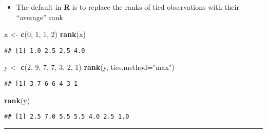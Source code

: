 \documentclass[]{book}
\newenvironment{Shaded}{\begin{snugshade}}{\end{snugshade}}
\newcommand{\DataTypeTok}[1]{\textcolor[rgb]{0.13,0.29,0.53}{#1}}
\newcommand{\DecValTok}[1]{\textcolor[rgb]{0.00,0.00,0.81}{#1}}
\newcommand{\KeywordTok}[1]{\textcolor[rgb]{0.13,0.29,0.53}{\textbf{#1}}}
\newcommand{\NormalTok}[1]{#1}
\newcommand{\StringTok}[1]{\textcolor[rgb]{0.31,0.60,0.02}{#1}}
\providecommand{\tightlist}{%
  \setlength{\itemsep}{0pt}\setlength{\parskip}{0pt}}
\begin{document}
\begin{itemize}
\tightlist
\item
  The default in \textbf{R} is to replace the ranks of tied observations with their ``average'' rank
\end{itemize}

\begin{Shaded}
\begin{Highlighting}[]
\NormalTok{x <-}\StringTok{ }\KeywordTok{c}\NormalTok{(}\DecValTok{0}\NormalTok{, }\DecValTok{1}\NormalTok{, }\DecValTok{1}\NormalTok{, }\DecValTok{2}\NormalTok{)  }
\KeywordTok{rank}\NormalTok{(x)}
\end{Highlighting}
\end{Shaded}

\begin{verbatim}
## [1] 1.0 2.5 2.5 4.0
\end{verbatim}

\begin{Shaded}
\begin{Highlighting}[]
\NormalTok{y <-}\StringTok{ }\KeywordTok{c}\NormalTok{(}\DecValTok{2}\NormalTok{, }\DecValTok{9}\NormalTok{, }\DecValTok{7}\NormalTok{, }\DecValTok{7}\NormalTok{, }\DecValTok{3}\NormalTok{, }\DecValTok{2}\NormalTok{, }\DecValTok{1}\NormalTok{)}
\KeywordTok{rank}\NormalTok{(y, }\DataTypeTok{ties.method=}\StringTok{"max"}\NormalTok{)}
\end{Highlighting}
\end{Shaded}

\begin{verbatim}
## [1] 3 7 6 6 4 3 1
\end{verbatim}

\begin{Shaded}
\begin{Highlighting}[]
\KeywordTok{rank}\NormalTok{(y)}
\end{Highlighting}
\end{Shaded}

\begin{verbatim}
## [1] 2.5 7.0 5.5 5.5 4.0 2.5 1.0
\end{verbatim}

\begin{center}\rule{0.5\linewidth}{\linethickness}\end{center}
\end{document}
